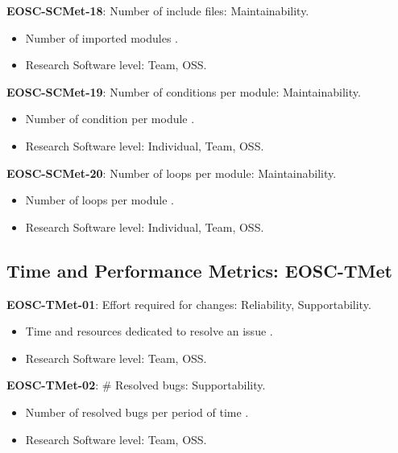 \textbf{EOSC-SCMet-18}: Number of include files: Maintainability.

\begin{itemize}
    \item Number of imported modules \cite{ogasawara_experiences_1996}.
    \item Research Software level: Team, OSS.
\end{itemize}

\textbf{EOSC-SCMet-19}: Number of conditions per module: Maintainability.

\begin{itemize}
    \item Number of condition per module \cite{ogasawara_experiences_1996}.
    \item Research Software level: Individual, Team, OSS.
\end{itemize}

\textbf{EOSC-SCMet-20}: Number of loops per module: Maintainability.

\begin{itemize}
    \item Number of loops per module \cite{ogasawara_experiences_1996}.
    \item Research Software level: Individual, Team, OSS.
\end{itemize}

\subsection{Time and Performance Metrics: EOSC-TMet}

\textbf{EOSC-TMet-01}: Effort required for changes: Reliability, Supportability.

\begin{itemize}
    \item Time and resources dedicated to resolve an issue \cite{montagud_systematic_2012}.
    \item Research Software level: Team, OSS.
\end{itemize}

\textbf{EOSC-TMet-02}: \# Resolved bugs: Supportability.

\begin{itemize}
    \item Number of resolved bugs per period of time \cite{montagud_systematic_2012}.
    \item Research Software level: Team, OSS.
\end{itemize}

